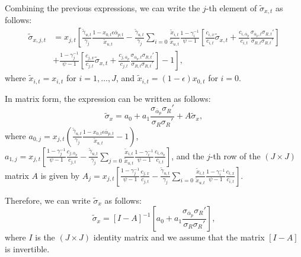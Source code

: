 \documentclass[12pt,english]{article}
\begin{document}
Combining the previous expressions, we can write the $ j $-th element of $\widetilde{\sigma}_{x,t}$ as follows:
\begin{align}
	\widetilde{\sigma}_{x,j,t} &= x_{j,t} \left[ \frac{\tilde{\gamma}_{u,t}}{\gamma_j} \frac{1-x_{0,t}\epsilon \overline{\alpha}_{p,t}}{\tilde{x}_{u,t}} - \frac{\tilde{\gamma}_{u,t}}{\gamma_j} \sum_{i=0} \frac{\tilde{x}_{i,t}}{\tilde{x}_{u,t}} \frac{1-\gamma_i^{-1}}{\psi-1} \left[\frac{c_{i,x}}{c_{i,t}} \widetilde{\sigma}_{x,t}+\frac{c_{i,\overline{\alpha}_p}}{c_{i,t}} \frac{\sigma_{\overline{\alpha}_p,t} \sigma_{R,t}'}{\sigma_{R,t}\sigma_{R,t}'}\right] \right.\nonumber\\
	&\left.+ \frac{1-\gamma_j^{-1}}{\psi-1} \left[\frac{c_{j,x}}{c_{j,t}} \widetilde{\sigma}_{x,t}+\frac{c_{j,\overline{\alpha}_p}}{c_{j,t}} \frac{\sigma_{\overline{\alpha}_p,t} \sigma_{R,t}'}{\sigma_{R,t}\sigma_{R,t}'}\right]-1\right],
\end{align}
where $\tilde{x}_{i,t} = x_{i,t}$ for $i= 1,\ldots, J$, and $\tilde{x}_{i,t} = (1-\epsilon) x_{0,t}$ for $i = 0$. 

In matrix form, the expression can be written as follows:
\begin{equation}
	\widetilde{\sigma}_{x} = a_{0} + a_1 \frac{\sigma_{\overline{\alpha}_p} \sigma_{R}'}{\sigma_{R}\sigma_{R}'} + A \widetilde{\sigma}_x,
\end{equation}
where $a_{0,j} = x_{j,t} \left( \frac{\tilde{\gamma}_{u,t}}{\gamma_j} \frac{1-x_{0,t} \epsilon \overline{\alpha}_{p,t}}{\tilde{x}_{u,t}}  - 1\right) $, $a_{1,j} = x_{j,t} \left[ \frac{1-\gamma_j^{-1}}{\psi-1} \frac{c_{j,\overline{\alpha}_p}}{c_{j,t}} -  
\frac{\tilde{\gamma}_{u,t}}{\gamma_j} \sum_{j=0} \frac{\tilde{x}_{i,t}}{\tilde{x}_{u,t}} \frac{1-\gamma_i^{-1}}{\psi-1} \frac{c_{i,\overline{\alpha}_p}}{c_{i,t}}
\right]$, and the $j$-th row of the $ (J\times J )$ matrix $A$ is given by $A_j = x_{j,t} \left[ \frac{1-\gamma_j^{-1}}{\psi-1} \frac{c_{j,x}}{c_{j,t}} - \frac{\tilde{\gamma}_{u,t}}{\gamma_j} \sum_{i=0} \frac{\tilde{x}_{i,t}}{\tilde{x}_{u,t}} \frac{1-\gamma_i^{-1}}{\psi-1} \frac{c_{i,x}}{c_{i,t}} \right] $.

Therefore, we can write $\widetilde{\sigma}_x$ as follows:
\begin{equation}\label{eq:tilde-sigmax}
	\widetilde{\sigma}_{x} = [I-A]^{-1} \left[ a_{0} + a_1 \frac{\sigma_{\overline{\alpha}_p} \sigma_{R}'}{\sigma_{R}\sigma_{R}'} \right],
\end{equation}
where $ I $ is the $ (J\times J) $ identity matrix and we assume that the matrix $\left[I-A\right]$ is invertible.
\end{document}

